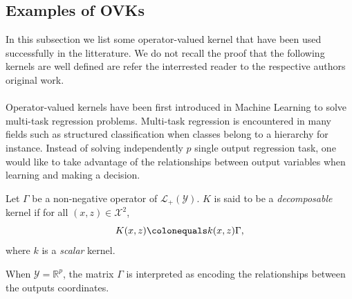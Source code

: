 \subsection{Examples of \aclp{OVK}}
\label{subsec:ovk-ex}
In this subsection we list some operator-valued kernel that have been used
successfully in the litterature. We do not recall the proof that the following
kernels are well defined are refer the interrested reader to the respective
authors original work.
\paragraph{}
Operator-valued kernels have been first introduced in Machine Learning to solve
multi-task regression problems. Multi-task regression is encountered in many
fields such as structured classification when classes belong to a hierarchy for
instance. Instead of solving independently $p$ single output regression task,
one would like to take advantage of the relationships between output variables
when learning and making a decision.
\begin{definition}
    \label{dec-kernel}
    Let $\Gamma$ be a non-negative operator of $\mathcal{L}_+(\mathcal{Y})$.
    $K$ is said to be a \emph{decomposable}
    kernel if for
    all $(x,z) \in \mathcal{X}^2$,
    \begin{dmath*}
        K(x,z) \colonequals k(x,z)\Gamma,
    \end{dmath*}
    where $k$ is a \emph{scalar} kernel.
\end{definition}
When $\mathcal{Y}=\mathbb{R}^p$, the matrix $\Gamma$ is
interpreted as encoding the relationships between the outputs coordinates.
